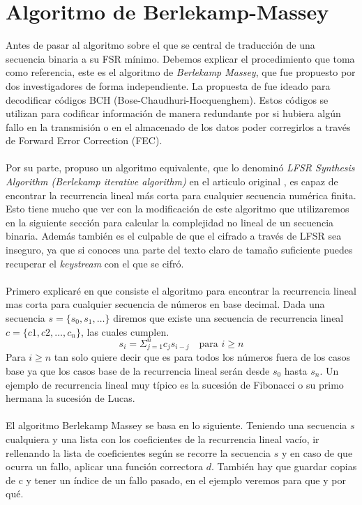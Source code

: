 \section{Algoritmo de Berlekamp-Massey}
Antes de pasar al algoritmo sobre el que se central de traducción de una secuencia binaria a su FSR mínimo. Debemos explicar el procedimiento que toma como referencia, este es el algoritmo de \textit{Berlekamp Massey}, que fue propuesto por dos investigadores de forma independiente. La propuesta de \cite{berlekamp1970bch}  fue ideado para decodificar códigos BCH (Bose-Chaudhuri-Hocquenghem). Estos códigos se utilizan para codificar información de manera redundante por si hubiera algún fallo en la transmisión o en el almacenado de los datos poder corregirlos a través de Forward Error Correction (FEC). \\\\
Por su parte, \cite{massey1969shift} propuso un algoritmo equivalente, que lo denominó \textit{LFSR Synthesis Algorithm (Berlekamp iterative algorithm)} en el articulo original , es capaz de encontrar la recurrencia lineal más corta para cualquier secuencia numérica finita. Esto tiene mucho que ver con la modificación de este algoritmo que utilizaremos en la siguiente sección para calcular la complejidad no lineal de un secuencia binaria. Además también es el culpable de que el cifrado a través de LFSR sea inseguro, ya que si conoces una parte del texto claro de tamaño suficiente puedes recuperar el \textit{keystream} con el que se cifró.\\\\
Primero explicaré en que consiste el algoritmo para encontrar la recurrencia lineal mas corta para cualquier secuencia de números en base decimal. Dada una secuencia $s = \{s_0, s_1, \dots\}$ diremos que existe una secuencia de recurrencia lineal $c = \{c1, c2, \dots, c_n\}$, las cuales cumplen.
\[s_i = \Sigma_{j=1}^n c_js_{i-j} \quad \text{para $i \geq n$}\]
Para $i \geq n$ tan solo quiere decir que es para todos los números fuera de los casos base ya que los casos base de la recurrencia lineal serán desde $s_0$ hasta $s_n$. Un ejemplo de recurrencia lineal muy típico es la sucesión de Fibonacci o su primo hermana la sucesión de Lucas. \\\\
El algoritmo Berlekamp Massey se basa en lo siguiente. Teniendo una secuencia $s$ cualquiera y una lista con los coeficientes de la recurrencia lineal vacío, ir rellenando la lista de coeficientes según se recorre la secuencia $s$ y en caso de que ocurra un fallo, aplicar una función correctora $d$. También hay que guardar copias de c y tener un índice de un fallo pasado, en el ejemplo veremos para que y por qué.\\\\ 
